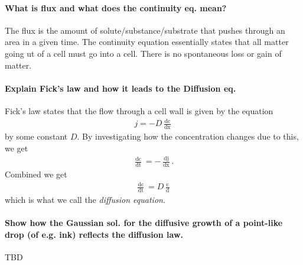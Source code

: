 \documentclass[a4paper,12pt]{article}
\begin{document}
         \paragraph{
            What is flux and what does the continuity eq. mean?
         }

            The flux is the amount of solute/substance/substrate that pushes
            through an area in a given time. The continuity equation
            essentially states that all matter going ut of a cell must go
            into a cell. There is no spontaneous loss or gain of matter.  

         \paragraph{
            Explain Fick’s law and how it leads to the Diffusion eq.
         }
            Fick's law states that the flow through a cell wall is given by the
            equation 
            \begin{align*}
               j = -D\frac{\mathop{dc}}{\mathop {dx}}
            \end{align*}
            by some constant $D$. By investigating how the concentration changes
            due to this, we get
            \begin{align*}
               \frac{\mathop {dc}}{\mathop {dt}} = -\frac{\mathop {dj}}{\mathop
               {dx}}.
            \end{align*}
            Combined we get 
            \begin{align*}
               \frac{\mathop {dc}}{\mathop {dt}} = D \frac{\mathop{d^2c}}{\mathop{dx^2}}
            \end{align*}
            which is what we call the \emph{diffusion equation}.

         \paragraph{
            Show how the Gaussian sol. for the diffusive growth of a point-like drop (of e.g. ink)
            reflects the diffusion law.
         }
            TBD
\end{document}
